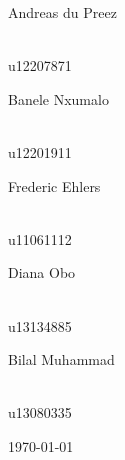 \documentclass[a4paper,12pt]{report}
\begin{document}
\begin{titlepage}
\begin{center}
\begin{minipage}{0.4\textwidth}
\begin{flushleft} \large
Andreas {du Preez}
\end{flushleft}
\end{minipage}
\begin{minipage}{0.4\textwidth}
\begin{flushright} \large
\emph{} \\
u12207871 
\end{flushright}
\end{minipage}
\begin{minipage}{0.4\textwidth}
\begin{flushleft} \large
Banele {Nxumalo}
\end{flushleft}
\end{minipage}
\begin{minipage}{0.4\textwidth}
\begin{flushright} \large
\emph{} \\
u12201911 
\end{flushright}
\end{minipage}
\begin{minipage}{0.4\textwidth}
\begin{flushleft} \large
Frederic {Ehlers}
\end{flushleft}
\end{minipage}
\begin{minipage}{0.4\textwidth}
\begin{flushright} \large
\emph{} \\
u11061112  
\end{flushright}
\end{minipage}
\begin{minipage}{0.4\textwidth}
\begin{flushleft} \large
Diana {Obo}
\end{flushleft}
\end{minipage}
\begin{minipage}{0.4\textwidth}
\begin{flushright} \large
\emph{} \\
u13134885
\end{flushright}
\end{minipage}
\begin{minipage}{0.4\textwidth}
\begin{flushleft} \large
Bilal {Muhammad}
\end{flushleft}
\end{minipage}
\begin{minipage}{0.4\textwidth}
\begin{flushright} \large
\emph{} \\
u13080335
\end{flushright}
\end{minipage}
\vfill

{\large \today}
\end{center}
\end{titlepage}
\footnotesize
\normalsize
\end{document}
